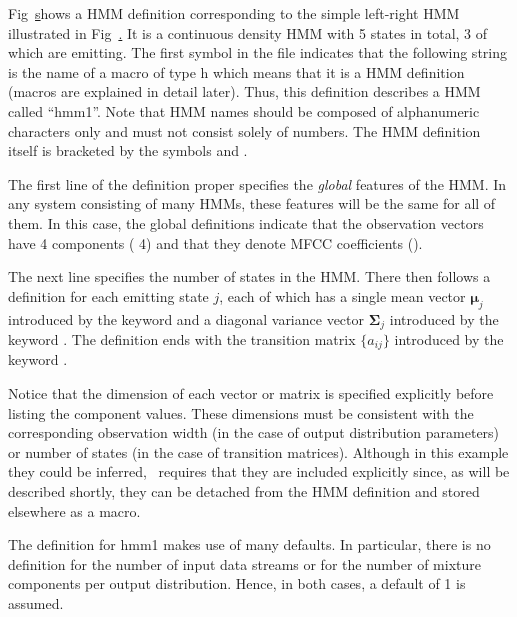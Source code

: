 Fig~\href{f:hmm1def} shows a HMM definition corresponding to the simple
left-right HMM illustrated in Fig~\href{f:hmm1}.  It is a continuous density
HMM with 5 states in total, 3 of which are emitting.  The first symbol in the
file  indicates that the following string is the name of a macro of
type \textsf{h} which means that it is a HMM definition (macros are explained
in detail later).  Thus, this definition describes a HMM called ``hmm1''.  
Note that HMM names should be composed of alphanumeric characters only and must
not consist solely of numbers. The HMM definition itself is bracketed by the
symbols  and
.

The first 
line of the definition proper specifies
the \textit{global} features of the HMM.  In any system
consisting of many HMMs, these
features will be the same for all of them.
In this case, the global definitions indicate that
the observation vectors have 4 components
( 4) and that they denote
MFCC coefficients ().

The next line specifies the number of states in the HMM. There
then follows a definition for each emitting state $j$, each of which
has a single mean 
vector $\bm{\mu}_j$ introduced by the keyword 
and a diagonal variance vector $\bm{\Sigma}_j$
introduced by the keyword .
The definition ends with the transition matrix $\{a_{ij}\}$
introduced by the keyword 
.  

Notice that
the dimension of each vector or matrix is specified
explicitly before listing the component values.  These
dimensions must be consistent with the corresponding observation 
width (in the case of output distribution parameters) or
number of states (in the case of transition matrices).
Although in this example they could be inferred, 
\HTK\ requires that 
they are included explicitly since, as will
be described shortly, they can be detached from the HMM definition
and stored elsewhere as a macro.


The definition for \textsf{hmm1} makes use of many defaults.
In particular, there is no definition for the number of
input data streams or for the number of 
mixture components per output distribution.  Hence, in both
cases, a default of 1 is assumed.

